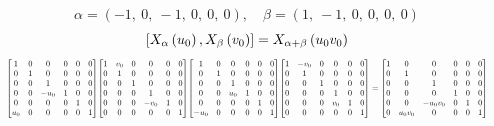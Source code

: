 \documentclass[11pt]{article}
\theoremstyle{definition}
\begin{document}
\[
\alpha = \left( -1, \  0, \  -1, \  0, \  0, \  0\right), \quad \beta = \left( 1, \  -1, \  0, \  0, \  0, \  0\right)
\]
\[
\scaletoalign{\textwidth}{\left[ X_{\alpha}\left(u_{0}\right), X_{\beta}\left(v_{0}\right) \right] = X_{\alpha + \beta}\left(u_{0} v_{0}\right)}
\]
\[
\scaletoalign{\textwidth}{{\left[\begin{matrix}1 & 0 & 0 & 0 & 0 & 0\\0 & 1 & 0 & 0 & 0 & 0\\0 & 0 & 1 & 0 & 0 & 0\\0 & 0 & - u_{0} & 1 & 0 & 0\\0 & 0 & 0 & 0 & 1 & 0\\u_{0} & 0 & 0 & 0 & 0 & 1\end{matrix}\right]} {\left[\begin{matrix}1 & v_{0} & 0 & 0 & 0 & 0\\0 & 1 & 0 & 0 & 0 & 0\\0 & 0 & 1 & 0 & 0 & 0\\0 & 0 & 0 & 1 & 0 & 0\\0 & 0 & 0 & - v_{0} & 1 & 0\\0 & 0 & 0 & 0 & 0 & 1\end{matrix}\right]} {\left[\begin{matrix}1 & 0 & 0 & 0 & 0 & 0\\0 & 1 & 0 & 0 & 0 & 0\\0 & 0 & 1 & 0 & 0 & 0\\0 & 0 & u_{0} & 1 & 0 & 0\\0 & 0 & 0 & 0 & 1 & 0\\- u_{0} & 0 & 0 & 0 & 0 & 1\end{matrix}\right]} {\left[\begin{matrix}1 & - v_{0} & 0 & 0 & 0 & 0\\0 & 1 & 0 & 0 & 0 & 0\\0 & 0 & 1 & 0 & 0 & 0\\0 & 0 & 0 & 1 & 0 & 0\\0 & 0 & 0 & v_{0} & 1 & 0\\0 & 0 & 0 & 0 & 0 & 1\end{matrix}\right]} = {\left[\begin{matrix}1 & 0 & 0 & 0 & 0 & 0\\0 & 1 & 0 & 0 & 0 & 0\\0 & 0 & 1 & 0 & 0 & 0\\0 & 0 & 0 & 1 & 0 & 0\\0 & 0 & - u_{0} v_{0} & 0 & 1 & 0\\0 & u_{0} v_{0} & 0 & 0 & 0 & 1\end{matrix}\right]}}
\]
\end{document}
